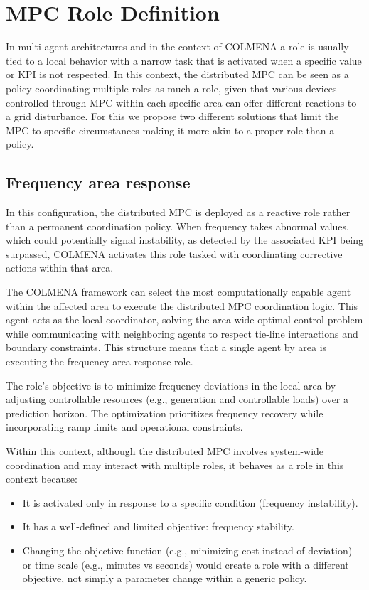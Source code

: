 \documentclass{article}
\begin{document}
\newpage
\section{MPC Role Definition}

In multi-agent architectures and in the context of COLMENA a role is usually tied to a local behavior with a narrow task that is activated when a specific value or KPI is not respected. In this context, the distributed MPC can be seen as a policy coordinating multiple roles as much a role, given that various devices controlled through MPC within each specific area can offer different reactions to a grid disturbance. For this we propose two different solutions that limit the MPC to specific circumstances making it more akin to a proper role than a policy.

\subsection{Frequency area response}

In this configuration, the distributed MPC is deployed as a reactive role rather than a permanent coordination policy. When frequency takes abnormal values, which could potentially signal instability, as detected by the associated KPI being surpassed, COLMENA activates this role tasked with coordinating corrective actions within that area.

The COLMENA framework can select the most computationally capable agent within the affected area to execute the distributed MPC coordination logic. This agent acts as the local coordinator, solving the area-wide optimal control problem while communicating with neighboring agents to respect tie-line interactions and boundary constraints. This structure means that a single agent by area is executing the frequency area response role.

The role's objective is to minimize frequency deviations in the local area by adjusting controllable resources (e.g., generation and controllable loads) over a prediction horizon. The optimization prioritizes frequency recovery while incorporating ramp limits and operational constraints.
 
Within this context, although the distributed MPC involves system-wide coordination and may interact with multiple roles, it behaves as a role in this context because:
\begin{itemize}
    \item It is activated only in response to a specific condition (frequency instability).
    \item It has a well-defined and limited objective: frequency stability.
    \item Changing the objective function (e.g., minimizing cost instead of deviation) or time scale (e.g., minutes vs seconds) would create a role with a different objective, not simply a parameter change within a generic policy.
\end{itemize}
\end{document}
